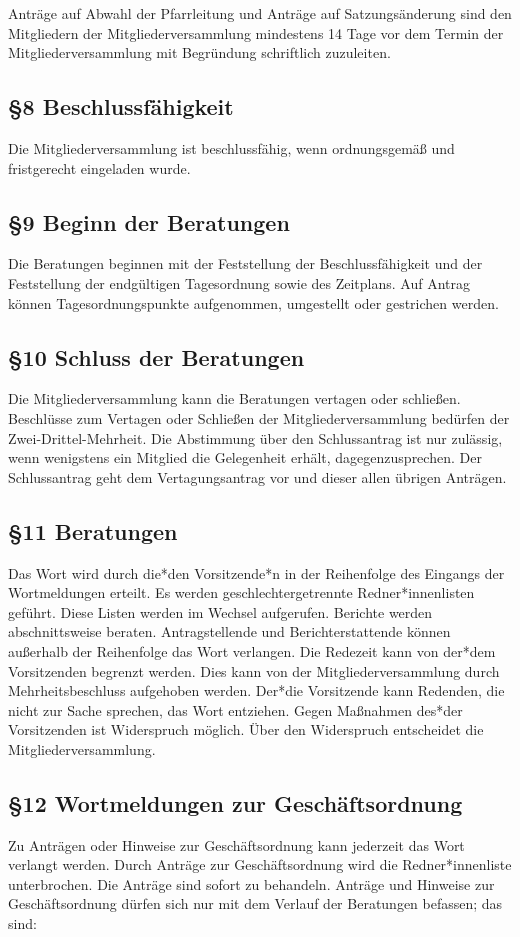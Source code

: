\documentclass[12pt]{report}
\begin{document}
\begin{flushleft}
Anträge auf Abwahl der Pfarrleitung und Anträge auf Satzungsänderung sind den Mitgliedern der
Mitgliederversammlung mindestens 14 Tage vor dem Termin der Mitgliederversammlung mit Begründung schriftlich
zuzuleiten.
\subsection*{§8 Beschlussfähigkeit}
Die Mitgliederversammlung ist beschlussfähig, wenn ordnungsgemäß und fristgerecht eingeladen wurde.
\subsection*{§9 Beginn der Beratungen}
Die Beratungen beginnen mit der Feststellung der Beschlussfähigkeit und der Feststellung der endgültigen
Tagesordnung sowie des Zeitplans. Auf Antrag können Tagesordnungspunkte aufgenommen, umgestellt
oder gestrichen werden.
\subsection*{§10 Schluss der Beratungen}
Die Mitgliederversammlung kann die Beratungen vertagen oder schließen. Beschlüsse zum Vertagen oder
Schließen der Mitgliederversammlung bedürfen der Zwei-Drittel-Mehrheit. Die Abstimmung über den
Schlussantrag ist nur zulässig, wenn wenigstens ein Mitglied die Gelegenheit erhält, dagegenzusprechen.
Der Schlussantrag geht dem Vertagungsantrag vor und dieser allen übrigen Anträgen.
\subsection*{§11 Beratungen}
Das Wort wird durch die*den Vorsitzende*n in der Reihenfolge des Eingangs der Wortmeldungen erteilt.
Es werden geschlechtergetrennte Redner*innenlisten geführt. Diese Listen werden im Wechsel aufgerufen. Berichte werden
abschnittsweise beraten. Antragstellende und Berichterstattende können außerhalb der Reihenfolge das
Wort verlangen. Die Redezeit kann von der*dem Vorsitzenden begrenzt werden. Dies kann von der 
Mitgliederversammlung durch Mehrheitsbeschluss aufgehoben werden. Der*die Vorsitzende kann Redenden, die
nicht zur Sache sprechen, das Wort entziehen. Gegen Maßnahmen des*der Vorsitzenden ist Widerspruch
möglich. Über den Widerspruch entscheidet die Mitgliederversammlung.
\subsection*{§12 Wortmeldungen zur Geschäftsordnung}
Zu Anträgen oder Hinweise zur Geschäftsordnung kann jederzeit das Wort verlangt werden. Durch Anträge
zur Geschäftsordnung wird die Redner*innenliste unterbrochen. Die Anträge sind sofort zu behandeln. Anträge und
Hinweise zur Geschäftsordnung dürfen sich nur mit dem Verlauf der Beratungen befassen; das sind:


\end{flushleft}
\end{document}
